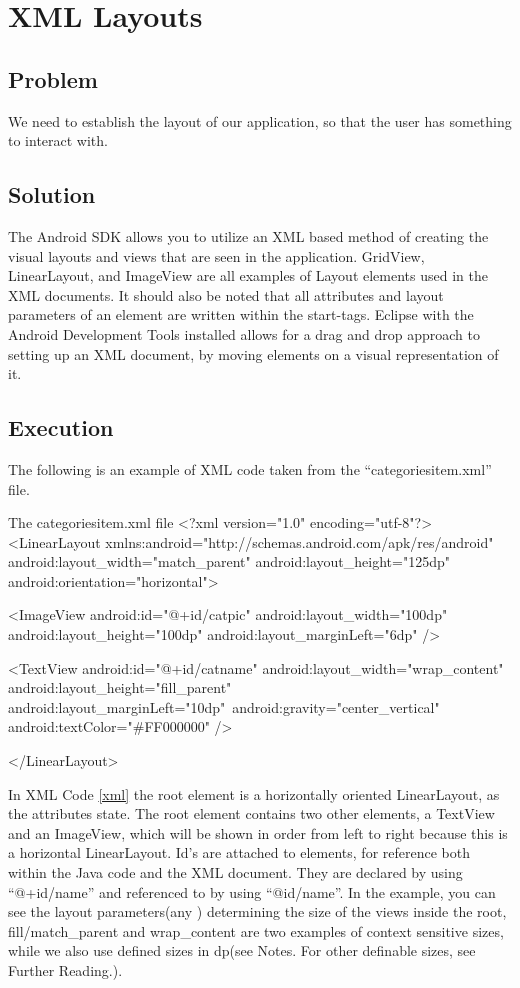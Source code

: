 \section{XML Layouts} %
\subsection*{Problem}
We need to establish the layout of our application, so that the user has something to interact with.
\subsection*{Solution}
The Android SDK allows you to utilize an XML based method of creating the visual layouts and views that are seen in the application.
GridView, LinearLayout, and ImageView are all examples of Layout elements used in the XML documents.
It should also be noted that all attributes and layout parameters of an element are written within the start-tags.
Eclipse with the Android Development Tools installed allows for a drag and drop approach to setting up an XML document, by moving elements on a visual representation of it.

\subsection*{Execution}
The following is an example of XML code taken from the ``categoriesitem.xml'' file.

\begin{xml}[{xml}]{The categoriesitem.xml file}
<?xml version="1.0" encoding="utf-8"?>
<LinearLayout xmlns:android="http://schemas.android.com/apk/res/android"
    android:layout_width="match_parent"
    android:layout_height="125dp"
    android:orientation="horizontal">

    <ImageView
        android:id="@+id/catpic"
        android:layout_width="100dp"
        android:layout_height="100dp"
        android:layout_marginLeft="6dp" />

    <TextView
        android:id="@+id/catname"
        android:layout_width="wrap_content"
        android:layout_height="fill_parent"
        android:layout_marginLeft="10dp"\
        android:gravity="center_vertical"
        android:textColor="#FF000000" />

</LinearLayout>
\end{xml}

In XML Code \ref{xml} the root element is a horizontally oriented LinearLayout, as the attributes state.
The root element contains two other elements, a TextView and an ImageView, which will be shown in order from left to right because this is a horizontal LinearLayout.
Id's are attached to elements, for reference both within the Java code and the XML document. They are declared by using ``@+id/name'' and referenced to by using ``@id/name''.\newline 
In the example, you can see the layout parameters(any ) determining the size of the views inside the root, fill/match\_parent and wrap\_content are two examples of context sensitive sizes, while we also use defined sizes in dp(see Notes. For other definable sizes, see Further Reading.). \\

